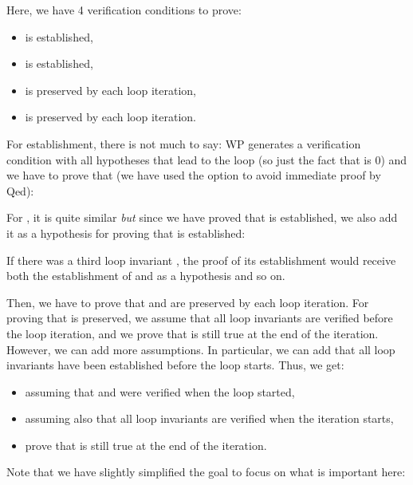 

Here, we have 4 verification conditions to prove:
\begin{itemize}
  \item {} is established,
  \item {} is established,
  \item {} is preserved by each loop iteration,
  \item {} is preserved by each loop iteration.
\end{itemize}
For  establishment, there is not much to say: WP generates a
verification condition with all hypotheses that lead to the loop (so just the
fact that  is 0) and we have to prove that 
(we have used the option  to avoid immediate proof by
Qed):




For , it is quite similar \emph{but} since we have proved that
 is established, we also add it as a hypothesis for proving that
 is established:




If there was a third loop invariant , the proof of its
establishment would receive both the establishment of  and
 as a hypothesis and so on.


Then, we have to prove that  and  are preserved by
each loop iteration. For proving that  is preserved, we assume
that all loop invariants are verified before the loop iteration, and we prove
that  is still true at the end of the iteration. However, we can
add more assumptions. In particular, we can add that all loop invariants have
been established before the loop starts. Thus, we get:
\begin{itemize}
  \item assuming that  and  were verified when the
        loop started,
  \item assuming also that all loop invariants are verified when the iteration
        starts,
  \item prove that  is still true at the end of the iteration.
\end{itemize}
Note that we have slightly simplified the goal to focus on what is important
here:


